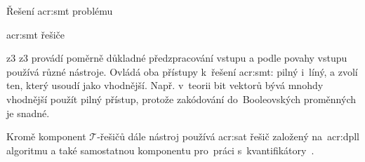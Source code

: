 \documentclass[thesis=M,czech]{FITthesis}[2012/06/26]
\newcommand{\acrlabel}[1]{acr:#1}
\newcommand{\acr}[1]{\acrshort{\acrlabel{#1}}}
\newcommand{\cit}[1]{\cite{#1}}
\newcommand{\set}[1]{\ensuremath{\mathcal{#1}}}
\begin{document}
\begin{section}{Řešení \acr{smt} problému}
\begin{subsection}{\acr{smt} řešiče}
\begin{paragraph}{z3}
z3 provádí poměrně důkladné předzpracování vstupu
a podle povahy vstupu používá různé nástroje.
Ovládá oba přístupy k~řešení
\acr{smt}: pilný i~líný,
a zvolí ten, který usoudí jako vhodnější.
Např. v~teorii bit vektorů bývá mnohdy
vhodnější použít pilný přístup,
protože zakódování do~Booleovských proměnných je snadné.

Kromě komponent \set{T}-řešičů
dále nástroj používá \acr{sat} řešič
založený na~\acr{dpll} algoritmu
a také samostatnou komponentu
pro~práci s~kvantifikátory~\cit{z3-art}.
\end{paragraph} %


\end{subsection} %


\end{section} %

\end{document}
